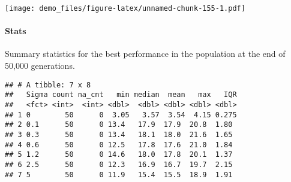 \documentclass[]{book}
\newenvironment{Shaded}{\begin{snugshade}}{\end{snugshade}}
\newcommand{\DataTypeTok}[1]{\textcolor[rgb]{0.13,0.29,0.53}{#1}}
\newcommand{\KeywordTok}[1]{\textcolor[rgb]{0.13,0.29,0.53}{\textbf{#1}}}
\newcommand{\NormalTok}[1]{#1}
\newcommand{\OperatorTok}[1]{\textcolor[rgb]{0.81,0.36,0.00}{\textbf{#1}}}
\newcommand{\OtherTok}[1]{\textcolor[rgb]{0.56,0.35,0.01}{#1}}
\newcommand{\StringTok}[1]{\textcolor[rgb]{0.31,0.60,0.02}{#1}}
\let\oldparagraph\paragraph
\renewcommand{\paragraph}[1]{\oldparagraph{#1}\mbox{}}
\begin{document}
\texttt{[image: demo\_files/figure-latex/unnamed-chunk-155-1.pdf]}

\hypertarget{stats-71}{%
\paragraph{Stats}\label{stats-71}}

Summary statistics for the best performance in the population at the end of 50,000 generations.

\begin{Shaded}
\end{Shaded}

\begin{verbatim}
## # A tibble: 7 x 8
##   Sigma count na_cnt   min median  mean   max   IQR
##   <fct> <int>  <int> <dbl>  <dbl> <dbl> <dbl> <dbl>
## 1 0        50      0  3.05   3.57  3.54  4.15 0.275
## 2 0.1      50      0 13.4   17.9  17.9  20.8  1.80 
## 3 0.3      50      0 13.4   18.1  18.0  21.6  1.65 
## 4 0.6      50      0 12.5   17.8  17.6  21.0  1.84 
## 5 1.2      50      0 14.6   18.0  17.8  20.1  1.37 
## 6 2.5      50      0 12.3   16.9  16.7  19.7  2.15 
## 7 5        50      0 11.9   15.4  15.5  18.9  1.91
\end{verbatim}
\end{document}

